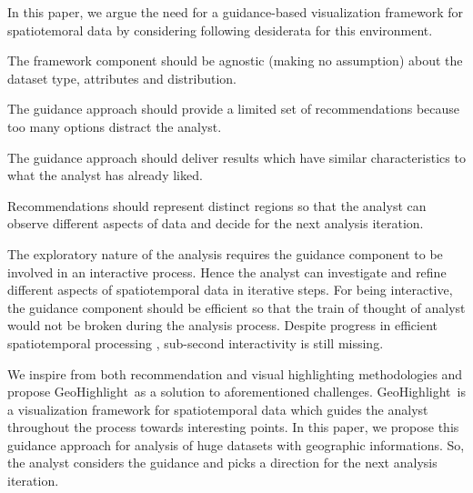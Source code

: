 \documentclass[conference]{IEEEtran}
\newcommand{\sys}{{\sc GeoHighlight}}
\begin{document}
In this paper, we argue the need for a guidance-based visualization framework for spatiotemoral data by considering following desiderata for this environment.

 The framework component should be agnostic (making no assumption) about the dataset type, attributes and distribution.

 The guidance approach should provide a limited set of recommendations because too many options distract the analyst. %

 The guidance approach should deliver results which have similar characteristics to what the analyst has already liked.

 Recommendations should represent distinct regions so that the analyst can observe different aspects of data and decide for the next analysis iteration.

 The exploratory nature of the analysis requires the guidance component to be involved in an interactive process. Hence the analyst can investigate and refine different aspects of spatiotemporal data in iterative steps. For being interactive, the guidance component should be efficient so that the train of thought of analyst would not be broken during the analysis process. Despite progress in efficient spatiotemporal processing \cite{yu2015geospark}, sub-second interactivity is still missing.

We inspire from both recommendation \cite{Omidvar-Tehrani:2015} and visual highlighting \cite{Liang2010,Robinson2011} methodologies and propose \sys\ as a solution to aforementioned challenges. \sys\ is a visualization framework for spatiotemporal data which guides the analyst throughout the process towards interesting points. In this paper, we propose this guidance approach for analysis of huge datasets with geographic informations. So, the analyst considers the guidance and picks a direction for the next analysis iteration.

\end{document}
